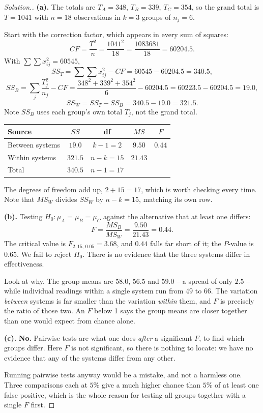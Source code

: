\documentclass[11pt,a4paper]{article}
\theoremstyle{definition}
\newenvironment{solution}
  {\renewcommand{\qedsymbol}{}\begin{proof}[\textit{Solution}.]}
  {\end{proof}}
\begin{document}
\begin{solution}
\textbf{(a).} The totals are $T_A=348$, $T_B=339$, $T_C=354$, so the grand total is
$T=1041$ with $n=18$ observations in $k=3$ groups of $n_j=6$.

Start with the correction factor, which appears in every sum of squares:
\[CF=\frac{T^2}{n}=\frac{1041^2}{18}=\frac{1083681}{18}=60204.5.\]
With $\sum\sum x_{ij}^2=60545$,
\[SS_T=\sum\sum x_{ij}^2-CF=60545-60204.5=340.5,\]
\[SS_B=\sum_{j}\frac{T_j^2}{n_j}-CF=\frac{348^2+339^2+354^2}{6}-60204.5=60223.5-60204.5=19.0,\]
\[SS_W=SS_T-SS_B=340.5-19.0=321.5.\]
Note $SS_B$ uses each group's own total $T_j$, not the grand total.

\begin{table}[H]
\centering
\begin{tabular}{lcccc}
Source & $SS$ & df & $MS$ & $F$\\
\hline
Between systems & $19.0$ & $k-1=2$ & $9.50$ & $0.44$\\
Within systems  & $321.5$ & $n-k=15$ & $21.43$ & \\
\hline
Total & $340.5$ & $n-1=17$ & & \\
\end{tabular}
\end{table}
The degrees of freedom add up, $2+15=17$, which is worth checking every time. Note that
$MS_W$ divides $SS_W$ by $n-k=15$, matching its own row.

\textbf{(b).} Testing $H_0:\mu_A=\mu_B=\mu_C$ against the alternative that at least one
differs:
\[F=\frac{MS_B}{MS_W}=\frac{9.50}{21.43}=0.44.\]
The critical value is $F_{2,15,\,0.05}=3.68$, and $0.44$ falls far short of it; the
$P$-value is $0.65$. We fail to reject $H_0$. There is no evidence that the three systems
differ in effectiveness.

Look at why. The group means are $58.0$, $56.5$ and $59.0$ -- a spread of only $2.5$ --
while individual readings within a single system run from $49$ to $66$. The variation
\emph{between} systems is far smaller than the variation \emph{within} them, and $F$ is
precisely the ratio of those two. An $F$ below 1 says the group means are closer together
than one would expect from chance alone.

\textbf{(c).} \textbf{No.} Pairwise tests are what one does \emph{after} a significant $F$,
to find which groups differ. Here $F$ is not significant, so there is nothing to locate:
we have no evidence that any of the systems differ from any other.

Running pairwise tests anyway would be a mistake, and not a harmless one. Three comparisons
each at $5\%$ give a much higher chance than $5\%$ of at least one false positive, which is
the whole reason for testing all groups together with a single $F$ first.
\end{solution}
\end{document}
